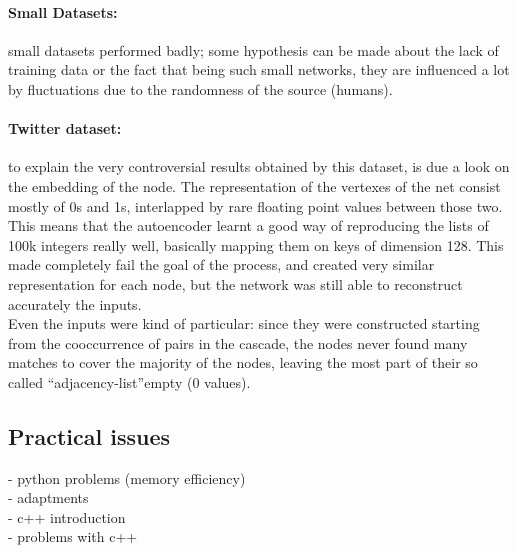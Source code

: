 \documentclass{article}
\begin{document}
			
				\paragraph{Small Datasets:} small datasets performed badly; some hypothesis can be made about the lack of training data or the fact that being such small networks, they are influenced a lot by fluctuations due to the randomness of the source (humans).
				\paragraph{Twitter dataset:} to explain the very controversial results obtained by this dataset, is due a look on the embedding of the node. The representation of the vertexes of the net consist mostly of 0s and 1s, interlapped by rare floating point values between those two. This means that the autoencoder learnt a good way of reproducing the lists of 100k integers really well, basically mapping them on keys of dimension 128. This made completely fail the goal of the process, and created very similar representation for each node, but the network was still able to reconstruct accurately the inputs.\\
				Even the inputs were kind of particular: since they were constructed starting from the cooccurrence of pairs in the cascade, the nodes never found many matches to cover the majority of the nodes, leaving the most part of their so called \textquotedblleft adjacency-list\textquotedblright empty (0 values).
				
				\newpage
			\subsection{Practical issues}
			- python problems (memory efficiency)\\
			- adaptments\\
			- c++ introduction\\
			- problems with c++\\
			
\end{document}
